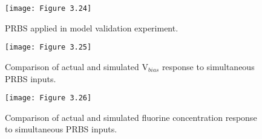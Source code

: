 \begin{figure}[H]
	\centering
	\texttt{[image: Figure 3.24]}
	\bf\caption{ PRBS applied in model validation experiment.}
	\label{fig:3.24}
\end{figure}

\begin{figure}[H]
	\centering
	\texttt{[image: Figure 3.25]}
	\bf\caption{  Comparison of actual and simulated $\text{V}_{bias}$ response to simultaneous PRBS inputs.}
	\label{fig:3.25}
\end{figure}

\begin{figure}[H]
	\centering
	\texttt{[image: Figure 3.26]}
	\bf\caption{ Comparison of actual and simulated fluorine concentration response to simultaneous PRBS inputs.}
	\label{fig:3.26}
\end{figure}